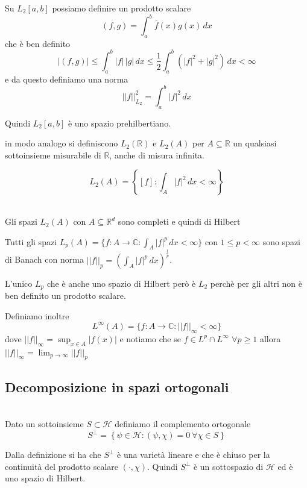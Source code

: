 \documentclass[11pt,a4paper,twoside]{book}
\newenvironment{teorema}[1][\empty]{\begin{Teorema}{
\ifx\empty#1\relax\else\mdseries\itshape#1\\\fi
}{}}{\end{Teorema}}
\newenvironment{definizione}[1][\empty]{\begin{Definizione}{
\ifx\empty#1\relax\else\mdseries\itshape#1\\\fi
}{}}{\end{Definizione}}
\newenvironment{osservazione}[1][Osservazione]{ 
  \begin{center}\begin{tcolorbox}[
  title={#1:~},
  width=0.9\linewidth,
  flush right,
  enhanced jigsaw, 
  colback=white, 
  frame hidden, 
  sharpish corners, arc=3mm,
  borderline west = {1pt}{0pt}{gray},
  borderline south = {1pt}{0pt}{gray},
  coltitle=black, 
  fonttitle=\small\bfseries, 
  attach title to upper, 
  breakable,
  top=2.5pt, bottom=0.3pt]\small
  }{
 \normalsize \end{tcolorbox}\end{center}
}
\theoremstyle{esss}
\theoremstyle{dotless}
\numberwithin{equation}{section} %
\begin{document}
Su $L_2[a,b]$ possiamo definire un prodotto scalare 
\begin{equation} 
(f,g)=\int_a^b \overline{f}(x)g(x)\,dx 
\end{equation}
che è ben definito 
\[
|(f,g)|\leq\int_a^b |f|\,|g|\,dx\leq\frac{1}{2}\int_a^b (|f|^2+|g|^2)\,dx<\infty
\]
e da questo definiamo una norma 
\begin{equation}
||f||^2_{L_2}=\int_a^b |f|^2\,dx
\end{equation}

Quindi $L_2[a,b]$ è uno spazio prehilbertiano.

in modo analogo si definiscono $L_2(\mathbb{R})$ e $L_2(A)$ per $A\subseteq\mathbb{R}$ un qualsiasi sottoinsieme misurabile di $\mathbb{R}$, anche di misura infinita.

\[
L_2(A)=\left\{[f]:\int_A |f|^2\,dx<\infty\right\}
\]

\begin{teorema}Gli spazi $L_2(A)$ con $A\subseteq\mathbb{R}^d$ sono completi e quindi di Hilbert\end{teorema}

\begin{osservazione}
Tutti gli spazi $L_p(A)=\{f:A\rightarrow\mathbb{C} : \int_A |f|^p\,dx<\infty\}$ con $1\leq p<\infty$ sono spazi di Banach con norma $||f||_p=\left(\int_A |f|^p \, dx\right)^{\frac{1}{p}}$.

L'unico $L_p$ che è anche uno spazio di Hilbert però è $L_2$ perchè per gli altri non è ben definito un prodotto scalare.


Definiamo inoltre \[L^\infty(A)=\{f:A\rightarrow\mathbb{C} : ||f||_\infty<\infty\}\] dove $||f||_\infty=\sup_{x\in A}|f(x)|$ e notiamo che se $f\in L^p\cap L^\infty$ $\forall p\geq 1$ allora \\$||f||_\infty = \lim_{p\rightarrow\infty} ||f||_p$
\end{osservazione}

\subsection{Decomposizione in spazi ortogonali}

\begin{definizione}
Dato un sottoinsieme $S\subset\mathcal{H}$ definiamo il complemento ortogonale 
\[
S^\perp=\left\{ \psi\in\mathcal{H} : (\psi,\chi)=0 \> \forall\chi\in S\right\}
\]
\end{definizione}

Dalla definizione si ha che $S^\perp$ è una varietà lineare e che è chiuso per la continuità del prodotto scalare $(\cdot,\chi)$. Quindi $S^\perp$ è un sottospazio di $\mathcal{H}$ ed è uno spazio di Hilbert.
\end{document}
